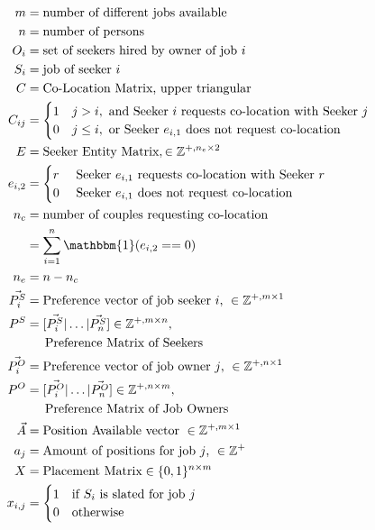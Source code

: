 \begin{align}
m &= \text{number of different jobs available}\\
n &= \text{number of persons}\\
O_i &= \text{set of seekers hired by owner of job $i$} \\
S_i &= \text{job of seeker $i$} \\
C &= \text{Co-Location Matrix, upper triangular}\\
C_{ij} &= \begin{cases}
1 & j > i, \text{ and  Seeker $i$ requests co-location with Seeker $j$} \\
0 & j\leq i, \text{ or Seeker $e_{i,1}$ does not request co-location}
\end{cases} \\
E &= \text{Seeker Entity Matrix}, \in \mathbb{Z}^{+, n_e \times 2}\\
e_{i,2} &= \begin{cases}
r & \text{ Seeker $e_{i,1}$ requests co-location with Seeker $r$} \\
0 & \text{ Seeker $e_{i,1}$ does not request co-location}
\end{cases} \\
n_c &= \text{number of couples requesting co-location}\\
&= \sum_{i=1}^n\mathbbm{1}(e_{i,2} == 0) \\
n_e &= n - n_c \\
\vec{P^S_i} &= \text{Preference vector of job seeker $i$, } \in \mathbb{Z}^{+, m \times 1} \\
P^S &= [\vec{P^S_i} | \dots | \vec{P^S_n}] \in \mathbb{Z}^{+, m \times n}, \\ 
&\text{\indent Preference Matrix of Seekers} \\
\vec{P^O_i} &= \text{Preference vector of job owner $j$, } \in \mathbb{Z}^{+, n \times 1} \\
P^O &= [\vec{P^O_i} | \dots | \vec{P^O_n}] \in \mathbb{Z}^{+, n \times m}, \\ 
&\text{\indent Preference Matrix of Job Owners} \\
\vec{A} &= \text{Position Available vector }\in \mathbb{Z}^{+, m \times 1} \\
a_j &= \text{Amount of positions for job $j$, } \in \mathbb{Z}^{+} \\
X &= \text{Placement Matrix} \in \{0,1\}^{n \times m} \\
x_{i,j} &= \begin{cases}
1 & \text{if $S_i$ is slated for job $j$}\\
0 & \text{otherwise}
\end{cases}
\end{align}

